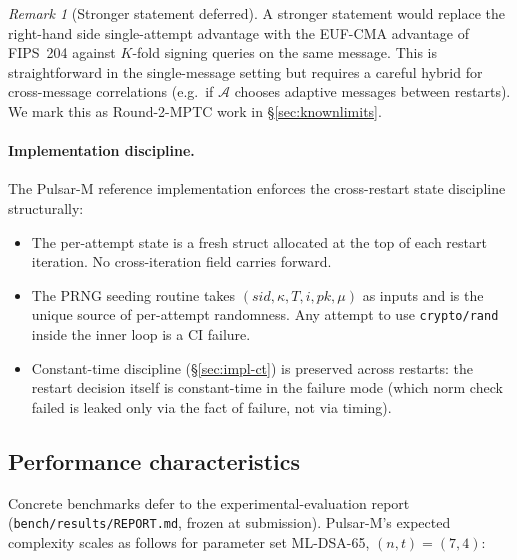 \documentclass[11pt,a4paper]{article}
\theoremstyle{definition}
\theoremstyle{remark}
\newtheorem{remark}{Remark}
\begin{document}
\begin{remark}[Stronger statement deferred]
A stronger statement would replace the right-hand side
single-attempt advantage with the EUF-CMA advantage of FIPS~204
against $K$-fold signing queries on the same message. This is
straightforward in the single-message setting but requires a careful
hybrid for cross-message correlations (e.g.\ if $\mathcal{A}$
chooses adaptive messages between restarts). We mark this as
Round-2-MPTC work in \S\ref{sec:knownlimits}.
\end{remark}

\paragraph{Implementation discipline.}
The Pulsar-M reference implementation enforces the cross-restart
state discipline structurally:

\begin{itemize}[leftmargin=*, itemsep=0pt]
\item The per-attempt state is a fresh struct allocated at the top
of each restart iteration. No cross-iteration field carries forward.
\item The PRNG seeding routine takes
$(\mathit{sid}, \kappa, T, i, \mathit{pk}, \mu)$ as inputs and is
the unique source of per-attempt randomness. Any attempt to use
\texttt{crypto/rand} inside the inner loop is a CI failure.
\item Constant-time discipline (\S\ref{sec:impl-ct}) is preserved
across restarts: the restart decision itself is constant-time in
the failure mode (which norm check failed is leaked only via the
fact of failure, not via timing).
\end{itemize}

\subsection{Performance characteristics}
\label{sec:impl-perf}

Concrete benchmarks defer to the experimental-evaluation report
(\texttt{bench/results/REPORT.md}, frozen at submission). Pulsar-M's
expected complexity scales as follows for parameter set ML-DSA-65,
$(n, t) = (7, 4)$:
\end{document}
